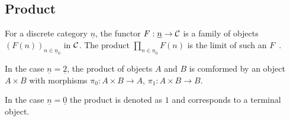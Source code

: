 \subsection{Product}

\begin{definition}[Product]\label{def:product_limit}

	For a discrete category $\underline{n}$, the functor $F:\underline{n}\to \mathcal{C}$
	is a family of objects $(F(n))_{n\in \underline{n}_0}$ in $\mathcal{C}$. The product
	$\prod\limits_{n\in \underline{n}_0} F(n)$ is the limit of such an
	$F$~\parencite[p.~108]{leinster:basic_category_theory}.
\end{definition}

\begin{remark}
	In the case $\underline{n}=\underline{2}$, the product of objects $A$ and $B$
	is comformed by an object $A\times B$ with morphisms $\pi_0:A\times B\to A$,
	$\pi_1: A\times B \to B$.
\end{remark}

\begin{remark}
	In the case $\underline{n}=\underline{0}$ the product is denoted as $1$
	and corresponds to a terminal object.
\end{remark}

